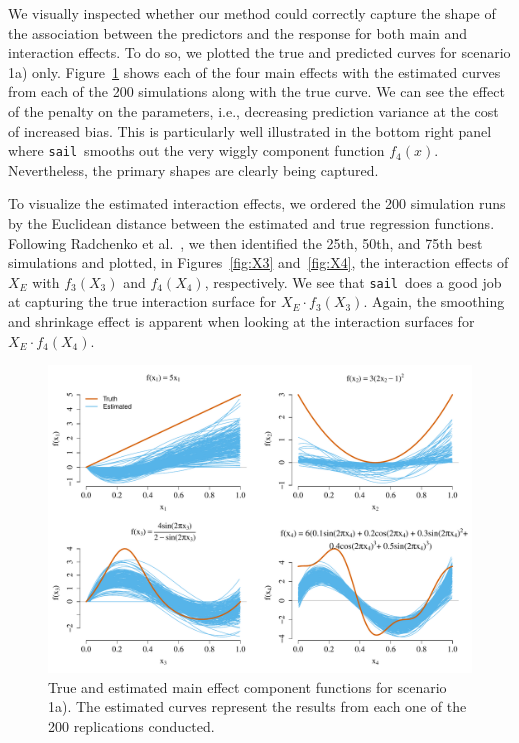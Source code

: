 \documentclass[a4paper,fleqn]{cas-sc}
\newcommand{\sail}{\texttt{sail}}
\begin{document}
We visually inspected whether our method could correctly capture the shape of the association between the predictors and the response for both main and interaction effects. To do so, we plotted the true and predicted curves for scenario 1a) only. Figure~\ref{fig:main_eff} shows each of the four main effects with the estimated curves from each of the 200 simulations along with the true curve. We can see the effect of the penalty on the parameters, i.e., decreasing prediction variance at the cost of increased bias. This is particularly well illustrated in the bottom right panel where \sail ~smooths out the very wiggly component function $f_4(x)$. Nevertheless, the primary shapes are clearly being captured.

To visualize the estimated interaction effects, we ordered the 200 simulation runs by the Euclidean distance between the estimated and true regression functions. Following Radchenko et al.~\citep{radchenko2010variable}, we then identified the 25th, 50th, and 75th best simulations and plotted, in Figures~\ref{fig:X3} and~\ref{fig:X4}, the interaction effects of $X_E$ with $f_3(X_3)$ and $f_4(X_4)$, respectively. We see that \sail ~does a good job at capturing the true interaction surface for $X_E \cdot f_3(X_3)$. Again, the smoothing and shrinkage effect is apparent when looking at the interaction surfaces for $X_E \cdot f_4(X_4)$.



\begin{figure}[h]
	\centering
	\includegraphics[scale=0.61]{figure/main-effects-simulation-1.pdf}
	\caption{True and estimated main effect component functions for scenario 1a). The estimated curves represent the results from each one of the 200 replications conducted.}\label{fig:main_eff}
\end{figure}
\end{document}
